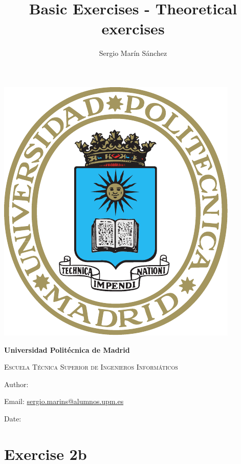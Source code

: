 \documentclass[12pt]{article}
\title{ Basic Exercises - Theoretical exercises %
}
\author{ Sergio Marín Sánchez %
}
\begin{document}
\begin{titlepage}
    \centering
    \phantom{a}
    \vspace{2cm}
    {\includegraphics[scale=0.9]{ESCUDO_UPM.pdf}\par}
    \vspace{2cm}
    {\bfseries\LARGE Universidad Politécnica de Madrid \par}
    \vspace{1cm}
    {\scshape\Large Escuela Técnica Superior de Ingenieros Informáticos \par}
    \vspace{1cm}
    {\scshape\Huge \thetitle \par}
    \vfill
    {\large Author: \theauthor \par}
    {\large Email: \href{mailto:sergio.marins@alumnos.upm.es}{sergio.marins@alumnos.upm.es} \par } %
    \vspace{0.2cm}
    {\large Date:  \par}
\end{titlepage}

\thispagestyle{empty}
\tableofcontents
\clearpage

\setcounter{page}{1}

\section{Exercise 2b}
\end{document}
